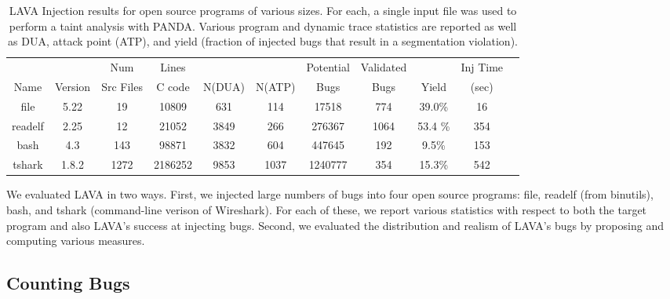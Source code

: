 \label{section:results}

\begin{table}[t!]
\centering
\begin{tabular}{c|c|c|c|c|c|c|c|c|c|c}
        &         & Num       & Lines     &        &        & Potential & Validated  &         & Inj Time \\
Name    & Version & Src Files & C code    & N(DUA) & N(ATP) & Bugs      & Bugs       & Yield   & (sec)  \\\hline
file    & 5.22    & 19        & 10809     & 631    & 114    & 17518     & 774        & 39.0\%  & 16         \\  %
readelf & 2.25    & 12        & 21052     & 3849   & 266    & 276367    & 1064       & 53.4 \% & 354     \\  %
bash    & 4.3     & 143       & 98871     & 3832   & 604    & 447645    & 192        & 9.5\%   & 153     \\  %
tshark  & 1.8.2   & 1272      & 2186252   & 9853   & 1037   & 1240777   & 354        & 15.3\%  & 542     \\
\end{tabular} 
\caption{LAVA Injection results for open source programs of various sizes.
For each, a single input file was used to perform a taint analysis with PANDA.
Various program and dynamic trace statistics are reported as well as DUA, attack point (ATP), and yield (fraction of injected bugs that result in a segmentation violation).}
\label{table:insertion-results}
\end{table}

We evaluated LAVA in two ways.
First, we injected large numbers of bugs into four open source programs: file, readelf (from binutils), bash, and tshark (command-line verison of Wireshark). %
For each of these, we report various statistics with respect to both the target program and also LAVA's success at injecting bugs.
Second, we evaluated the distribution and realism of LAVA's bugs by proposing and computing various measures.

\subsection*{Counting Bugs}

